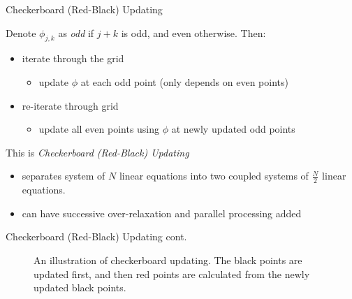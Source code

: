 \documentclass{beamer}
\begin{document}
\begin{frame}{Checkerboard (Red-Black) Updating}

Denote $\phi_{j,k}$ as \emph{odd} if $j+k$ is odd, and even otherwise. Then:

\begin{itemize}
\item iterate through the grid
 \begin{itemize}
 \item update $\phi$ at each odd point (only depends on even points)
 \end{itemize}
\item re-iterate through grid
 \begin{itemize}
 \item update all even points using $\phi$ at newly updated odd points
 \end{itemize}
\end{itemize}

This is \emph{Checkerboard (Red-Black) Updating}
\begin{itemize}
\item separates system of $N$ linear equations into two coupled systems of
$\frac{N}{2}$ linear equations.
\item can have successive over-relaxation and parallel processing added
\end{itemize}

\end{frame}

\begin{frame}{Checkerboard (Red-Black) Updating cont.}
\begin{figure}[h!]
\begin{center}
\end{center}
\caption{An illustration of checkerboard updating. The black points are updated first,
and then red points are calculated from the newly updated black points.}
\end{figure}

\end{frame}
\end{document}
